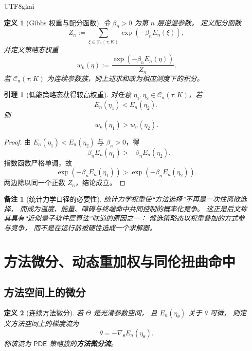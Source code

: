 \documentclass[12pt]{article}
\newtheorem{definition}{定义}[section]
\newtheorem{lemma}{引理}[section]
\newtheorem{remark}{备注}[section]
\newcommand{\PDE}{\mathsf{PDE}}
\begin{document}
\begin{CJK*}{UTF8}{gkai}
\begin{definition}[Gibbs 权重与配分函数]
令 \(\beta_n>0\) 为第 \(n\) 层逆温参数。
定义配分函数
\[
  Z_n
  :=
  \sum_{\xi\in\mathcal C_n(\tau;K)}
  \exp(-\beta_n E_n(\xi)),
\]
并定义策略态权重
\[
  w_n(\eta)
  :=
  \frac{\exp(-\beta_n E_n(\eta))}{Z_n}.
\]
若 \(\mathcal C_n(\tau;K)\) 为连续参数族，则上述求和改为相应测度下的积分。
\end{definition}

\begin{lemma}[低能策略态获得较高权重]
\label{lem:tex53-gibbs-order}
对任意 \(\eta_1,\eta_2\in\mathcal C_n(\tau;K)\)，若
\[
  E_n(\eta_1)<E_n(\eta_2),
\]
则
\[
  w_n(\eta_1)>w_n(\eta_2).
\]
\end{lemma}

\begin{proof}
由 \(E_n(\eta_1)<E_n(\eta_2)\) 与 \(\beta_n>0\)，得
\[
  -\beta_n E_n(\eta_1)>-\beta_n E_n(\eta_2).
\]
指数函数严格单调，故
\[
  \exp(-\beta_n E_n(\eta_1))
  >
  \exp(-\beta_n E_n(\eta_2)).
\]
两边除以同一个正数 \(Z_n\)，结论成立。
\end{proof}

\begin{remark}[统计力学口径的必要性]
统计力学权重使“方法选择”不再是一次性离散选择，
而成为温度、能量、障碍与终端命中共同控制的概率化竞争。
这正是后文称其具有“近似量子软件层算法”味道的原因之一：
候选策略态以权重叠加的方式参与竞争，
而不是在运行前被硬性选成一个求解器。
\end{remark}

\section{方法微分、动态重加权与同伦扭曲命中}
\label{sec:tex53-flow}

\subsection{方法空间上的微分}
\label{subsec:tex53-method-diff}

\begin{definition}[连续方法微分]
若 \(\Theta\) 是光滑参数空间，
且 \(E_n(\eta_\theta)\) 关于 \(\theta\) 可微，
则定义方法空间上的梯度流为
\[
  \dot\theta
  =
  -\nabla_\theta E_n(\eta_\theta).
\]
称该流为 \(\PDE\) 策略簇的\textbf{方法微分流}。
\end{definition}


\end{CJK*}
\end{document}
